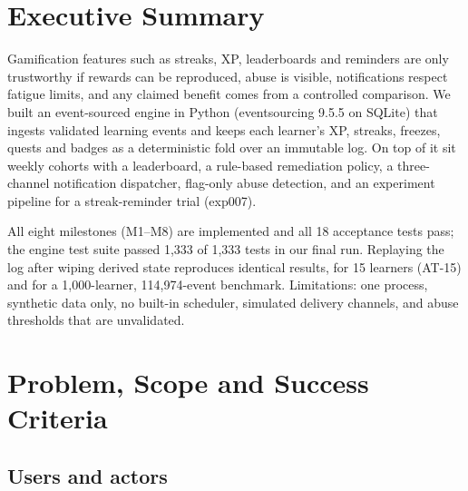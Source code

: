 \documentclass[11pt,a4paper]{article}
\renewcommand{\_}{\textunderscore\allowbreak{}}
\begin{document}
\setcounter{page}{1}

\tableofcontents
\newpage

\section*{Executive Summary}

Gamification features such as streaks, XP, leaderboards and reminders are only trustworthy if rewards can be reproduced, abuse is visible, notifications respect fatigue limits, and any claimed benefit comes from a controlled comparison. We built an event-sourced engine in Python (eventsourcing 9.5.5 on SQLite) that ingests validated learning events and keeps each learner's XP, streaks, freezes, quests and badges as a deterministic fold over an immutable log. On top of it sit weekly cohorts with a leaderboard, a rule-based remediation policy, a three-channel notification dispatcher, flag-only abuse detection, and an experiment pipeline for a streak-reminder trial (exp\_007).

All eight milestones (M1--M8) are implemented and all 18 acceptance tests pass; the engine test suite passed 1,333 of 1,333 tests in our final run. Replaying the log after wiping derived state reproduces identical results, for 15 learners (AT-15) and for a 1,000-learner, 114,974-event benchmark. Limitations: one process, synthetic data only, no built-in scheduler, simulated delivery channels, and abuse thresholds that are unvalidated.

\section{Problem, Scope and Success Criteria}

\subsection{Users and actors}
\end{document}

